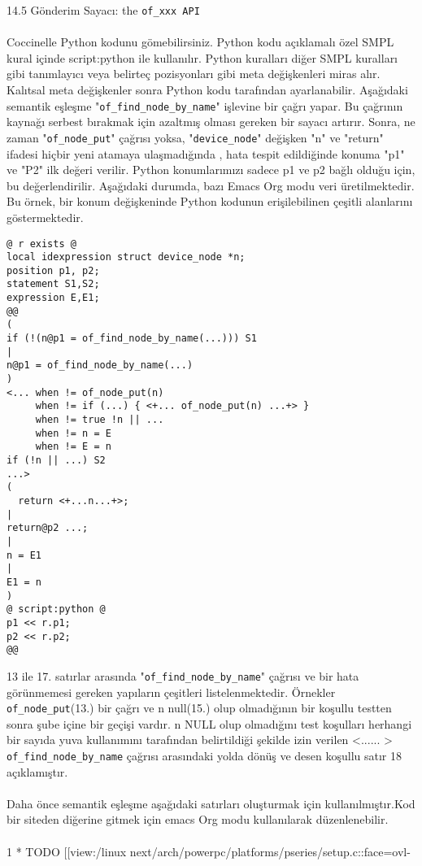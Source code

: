 \documentclass[22]{article}
\begin{document}
14.5 Gönderim Sayacı: the \texttt{of\_xxx API}\\
\\
Coccinelle Python kodunu gömebilirsiniz. Python kodu açıklamalı özel SMPL kural içinde script:python ile kullanılır. Python kuralları diğer SMPL kuralları gibi tanımlayıcı veya belirteç pozisyonları gibi meta değişkenleri miras alır. Kalıtsal meta değişkenler sonra Python kodu tarafından ayarlanabilir. Aşağıdaki semantik eşleşme "\texttt{of\_find\_node\_by\_name}" işlevine bir çağrı yapar. Bu çağrının kaynağı serbest bırakmak için azaltmış olması gereken bir sayacı artırır. 
Sonra, ne zaman "\texttt{of\_node\_put}" çağrısı yoksa, "\texttt{device\_node}" değişken "n" ve "return" ifadesi hiçbir yeni atamaya ulaşmadığında , hata tespit edildiğinde konuma "p1" ve "P2" ilk değeri verilir. Python konumlarımızı sadece  p1 ve p2 bağlı olduğu için, bu değerlendirilir. Aşağıdaki durumda, bazı Emacs Org modu veri üretilmektedir. Bu örnek, bir konum değişkeninde Python kodunun erişilebilinen çeşitli alanlarını göstermektedir.
\begin{lstlisting}
@ r exists @
local idexpression struct device_node *n; 
position p1, p2; 
statement S1,S2;
expression E,E1;
@@
(
if (!(n@p1 = of_find_node_by_name(...))) S1
|
n@p1 = of_find_node_by_name(...)
)
<... when != of_node_put(n)
     when != if (...) { <+... of_node_put(n) ...+> }
     when != true !n || ... 
     when != n = E 
     when != E = n 
if (!n || ...) S2
...>
(
  return <+...n...+>;
|
return@p2 ...;
|
n = E1
|
E1 = n 
)
@ script:python @
p1 << r.p1;
p2 << r.p2;
@@
\end{lstlisting}
13 ile 17. satırlar arasında "\texttt{of\_find\_node\_by\_name}" çağrısı ve bir hata görünmemesi gereken yapıların çeşitleri listelenmektedir. Örnekler \texttt{of\_node\_put}(13.) bir çağrı ve n null(15.) olup olmadığının bir koşullu testten sonra şube içine bir geçişi vardır. n NULL olup olmadığını test koşulları herhangi bir sayıda yuva kullanımını tarafından belirtildiği şekilde izin verilen <...... > \texttt{of\_find\_node\_by\_name} çağrısı arasındaki yolda dönüş ve desen koşullu satır 18 açıklamıştır.\\
\\
Daha önce semantik eşleşme aşağıdaki satırları oluşturmak için kullanılmıştır.Kod bir siteden diğerine gitmek için emacs Org modu kullanılarak düzenlenebilir.\\
\\
1 * TODO [[view:/linux next/arch/powerpc/platforms/pseries/setup.c::face=ovl-
      \tab\tab{face1::linb=236::colb=18::cole=20][inc. counter:/linux-next/arch/powerpc/}
\end{document}
